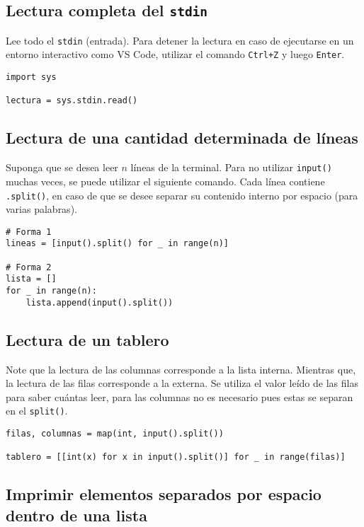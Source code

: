 \documentclass[12pt,letterpaper]{article}
\begin{document}
\subsection{Lectura completa del \texttt{stdin}}

Lee todo el \texttt{stdin} (entrada).
Para detener la lectura en caso de ejecutarse en un entorno interactivo como VS Code, utilizar el comando \texttt{Ctrl+Z} y luego \texttt{Enter}.

\begin{verbatim}
import sys

lectura = sys.stdin.read()
\end{verbatim}

\subsection{Lectura de una cantidad determinada de líneas}

Suponga que se desea leer $n$ líneas de la terminal.
Para no utilizar \texttt{input()} muchas veces, se puede utilizar el siguiente comando.
Cada línea contiene \texttt{.split()}, en caso de que se desee separar su contenido interno por espacio (para varias palabras).

\begin{verbatim}
# Forma 1
lineas = [input().split() for _ in range(n)]

# Forma 2
lista = []
for _ in range(n):
    lista.append(input().split())
\end{verbatim}

\subsection{Lectura de un tablero}

Note que la lectura de las columnas corresponde a la lista interna.
Mientras que, la lectura de las filas corresponde a la externa.
Se utiliza el valor leído de las filas para saber cuántas leer, para las columnas no es necesario pues estas se separan en el \texttt{split()}.

\begin{verbatim}
filas, columnas = map(int, input().split())

tablero = [[int(x) for x in input().split()] for _ in range(filas)]
\end{verbatim}

\subsection{Imprimir elementos separados por espacio dentro de una lista}
\end{document}
